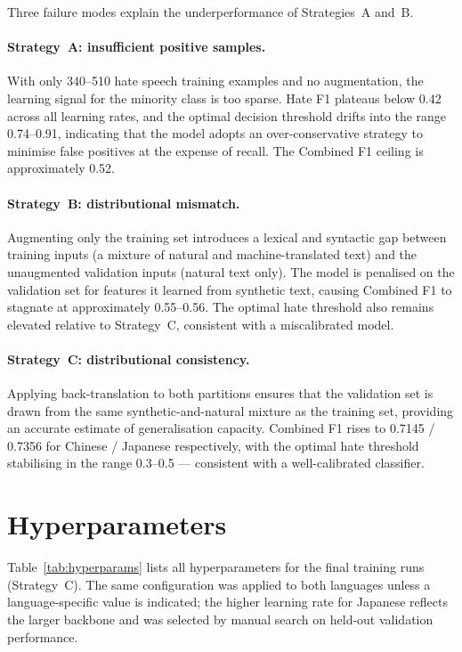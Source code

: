 \documentclass[../CLthesis.tex]{subfiles}
\begin{document}
Three failure modes explain the underperformance of Strategies~A and~B.

\paragraph{Strategy~A: insufficient positive samples.} With only 340--510 hate speech training examples and no augmentation, the learning signal for the minority class is too sparse. Hate F1 plateaus below 0.42 across all learning rates, and the optimal decision threshold drifts into the range 0.74--0.91, indicating that the model adopts an over-conservative strategy to minimise false positives at the expense of recall. The Combined F1 ceiling is approximately 0.52.

\paragraph{Strategy~B: distributional mismatch.} Augmenting only the training set introduces a lexical and syntactic gap between training inputs (a mixture of natural and machine-translated text) and the unaugmented validation inputs (natural text only). The model is penalised on the validation set for features it learned from synthetic text, causing Combined F1 to stagnate at approximately 0.55--0.56. The optimal hate threshold also remains elevated relative to Strategy~C, consistent with a miscalibrated model.

\paragraph{Strategy~C: distributional consistency.} Applying back-translation to both partitions ensures that the validation set is drawn from the same synthetic-and-natural mixture as the training set, providing an accurate estimate of generalisation capacity. Combined F1 rises to 0.7145 / 0.7356 for Chinese / Japanese respectively, with the optimal hate threshold stabilising in the range 0.3--0.5 --- consistent with a well-calibrated classifier.


\section{Hyperparameters}
\label{sec:app-hyper}

Table~\ref{tab:hyperparams} lists all hyperparameters for the final training runs (Strategy~C). The same configuration was applied to both languages unless a language-specific value is indicated; the higher learning rate for Japanese reflects the larger backbone and was selected by manual search on held-out validation performance.
\end{document}
